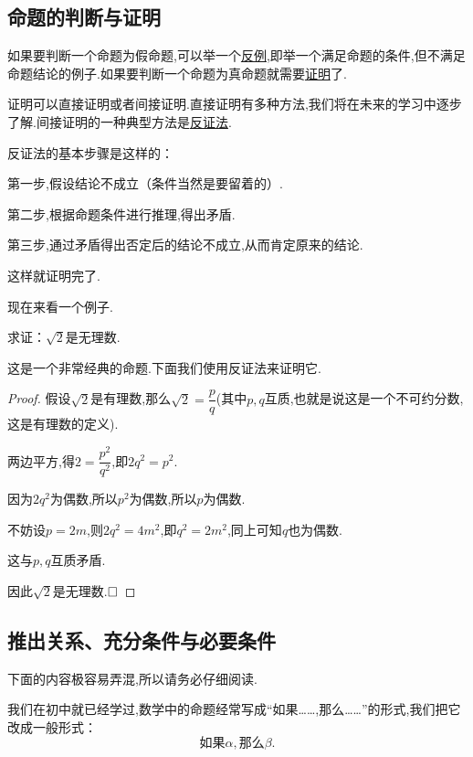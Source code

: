 \documentclass[lang=cn,math=cm,chinesefont=nofont,11pt,scheme=chinese,twocol]{elegantbook}
\begin{document}
\subsection{命题的判断与证明}

如果要判断一个命题为假命题,可以举一个\underline{反例},即举一个满足命题的条件,但不满足命题结论的例子.如果要判断一个命题为真命题就需要\underline{证明}了.

证明可以直接证明或者间接证明.直接证明有多种方法,我们将在未来的学习中逐步了解.间接证明的一种典型方法是\underline{反证法}.

反证法的基本步骤是这样的：

第一步,假设结论不成立（条件当然是要留着的）.

第二步,根据命题条件进行推理,得出矛盾.

第三步,通过矛盾得出否定后的结论不成立,从而肯定原来的结论.

这样就证明完了.

\hspace*{\fill}

现在来看一个例子.

\begin{example}
  求证：$\sqrt{2}$是无理数.
\end{example}
这是一个非常经典的命题.下面我们使用反证法来证明它.
\begin{proof}
  假设$\sqrt{2}$是有理数,那么$\sqrt{2}=\dfrac{p}{q}$(其中$p,q$互质,也就是说这是一个不可约分数,这是有理数的定义).

  两边平方,得$2=\dfrac{p^2}{q^2}$,即$2q^2=p^2$.

  因为$2q^2$为偶数,所以$p^2$为偶数,所以$p$为偶数.

  不妨设$p=2m$,则$2q^2=4m^2$,即$q^2=2m^2$,同上可知$q$也为偶数.

  这与$p,q$互质矛盾.

  因此$\sqrt{2}$是无理数.$\hfill\square$

\end{proof}

\subsection{推出关系、充分条件与必要条件}

\begin{remark}
  下面的内容极容易弄混,所以请务必仔细阅读.
\end{remark}

我们在初中就已经学过,数学中的命题经常写成“如果……,那么……”的形式,我们把它改成一般形式：
$$\text{如果}\alpha ,\text{那么}\beta.$$
\end{document}
